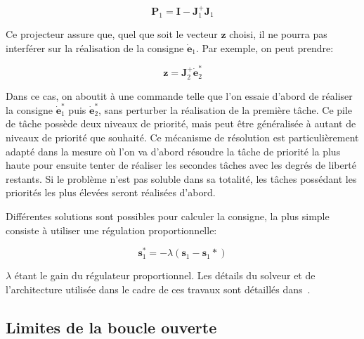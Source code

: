 \begin{equation}
  \mathbf{P}_1 = \mathbf{I} - \mathbf{J}_1^{+} \mathbf{J}_1
\end{equation}

Ce projecteur assure que, quel que soit le vecteur $\mathbf{z}$
choisi, il ne pourra pas interférer sur la réalisation de la consigne
$\dot{\mathbf{e}}_1$. Par exemple, on peut prendre:

\begin{equation}
  \mathbf{z} = \mathbf{J}_2^{+} \dot{\mathbf{e}}_2^{*}
\end{equation}

Dans ce cas, on aboutit à une commande telle que l'on essaie d'abord
de réaliser la consigne $\dot{\mathbf{e}}_1^{*}$ puis
$\dot{\mathbf{e}}_2^{*}$, sans perturber la réalisation de la première
tâche. Ce pile de tâche possède deux niveaux de priorité, mais peut
être généralisée à autant de niveaux de priorité que souhaité. Ce
mécanisme de résolution est particulièrement adapté dans la mesure où
l'on va d'abord résoudre la tâche de priorité la plus haute pour
ensuite tenter de réaliser les secondes tâches avec les degrés de
liberté restants. Si le problème n'est pas soluble dans sa totalité,
les tâches possédant les priorités les plus élevées seront réalisées
d'abord.


Différentes solutions sont possibles pour calculer la consigne, la
plus simple consiste à utiliser une régulation proportionnelle:

\begin{equation}
  \mathbf{s}_1^{*} = -\lambda (\mathbf{s}_1 - \mathbf{s}_1{*})
\end{equation}

$\lambda$ étant le gain du régulateur proportionnel. Les détails du
solveur et de l'architecture utilisée dans le cadre de ces travaux
sont détaillés dans \cite{09mansard.icar}.


\subsection{Limites de la boucle ouverte}

